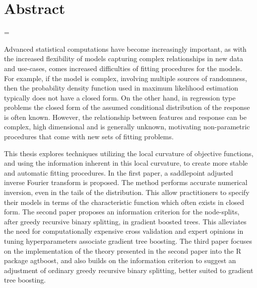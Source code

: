 \chapter*{Abstract}

\emergencystretch=\maxdimen
{}

Advanced statistical computations have become increasingly important, as with the increased flexibility of models capturing complex relationships in new data and use-cases,
comes increased difficulties of fitting procedures for the models.
For example, if the model is complex, involving multiple sources of randomness, then the probability density function used in maximum likelihood estimation typically does not have a closed form.
On the other hand, in regression type problems the closed form of the assumed conditional distribution of the response is often known. However, the relationship between features and response can be complex, high dimensional and is generally unknown, motivating non-parametric procedures that come with new sets of fitting problems.


This thesis explores techniques utilizing the local curvature of objective functions, and using the information inherent in this local curvature, to create more stable and automatic fitting procedures.
In the first paper, a saddlepoint adjusted inverse Fourier transform is proposed.
The method performs accurate numerical inversion, even in the tails of the distribution.
This allow practitioners to specify their models in terms of the characteristic function which often exists in closed form.
The second paper proposes an information criterion for the node-splits, after greedy recursive binary splitting, in gradient boosted trees.
This alleviates the need for computationally expensive cross validation and expert opinions in tuning hyperparameters associate gradient tree boosting.
The third paper focuses on the implementation of the theory presented in the second paper into the R package agtboost, and also builds on the information criterion to suggest an adjustment of ordinary greedy recursive binary splitting, better suited to gradient tree boosting.




